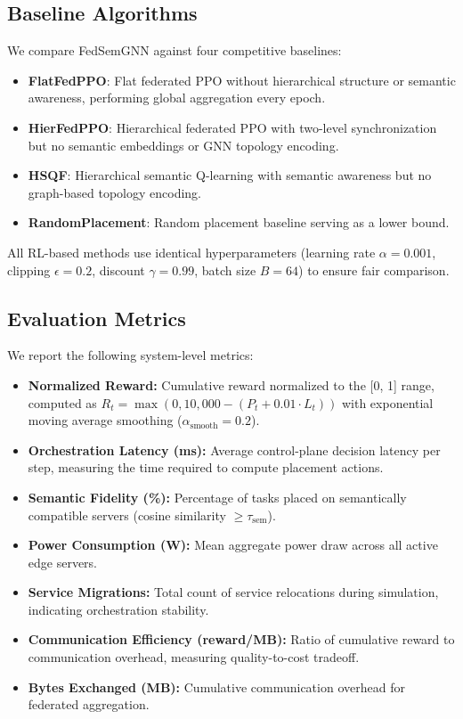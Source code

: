 \documentclass[conference]{IEEEtran}
\begin{document}
	\subsection{Baseline Algorithms}
	We compare FedSemGNN against four competitive baselines:
	
	\begin{itemize}
		\item \textbf{FlatFedPPO}: Flat federated PPO without hierarchical structure or semantic awareness, performing global aggregation every epoch.
		\item \textbf{HierFedPPO}: Hierarchical federated PPO with two-level synchronization but no semantic embeddings or GNN topology encoding.
		\item \textbf{HSQF}: Hierarchical semantic Q-learning with semantic awareness but no graph-based topology encoding.
		\item \textbf{RandomPlacement}: Random placement baseline serving as a lower bound.
	\end{itemize}
	
	All RL-based methods use identical hyperparameters (learning rate $\alpha = 0.001$, clipping $\epsilon = 0.2$, discount $\gamma = 0.99$, batch size $B = 64$) to ensure fair comparison.
	
	\subsection{Evaluation Metrics}
	We report the following system-level metrics:
	\begin{itemize}
		\item \textbf{Normalized Reward:} Cumulative reward normalized to the [0, 1] range, computed as $R_t = \max(0, 10{,}000 - (P_t + 0.01 \cdot L_t))$ with exponential moving average smoothing ($\alpha_{\text{smooth}} = 0.2$).
		\item \textbf{Orchestration Latency (ms):} Average control-plane decision latency per step, measuring the time required to compute placement actions.
		\item \textbf{Semantic Fidelity (\%):} Percentage of tasks placed on semantically compatible servers (cosine similarity $\geq \tau_{\text{sem}}$).
		\item \textbf{Power Consumption (W):} Mean aggregate power draw across all active edge servers.
		\item \textbf{Service Migrations:} Total count of service relocations during simulation, indicating orchestration stability.
		\item \textbf{Communication Efficiency (reward/MB):} Ratio of cumulative reward to communication overhead, measuring quality-to-cost tradeoff.
		\item \textbf{Bytes Exchanged (MB):} Cumulative communication overhead for federated aggregation.
	\end{itemize}
	
\end{document}
